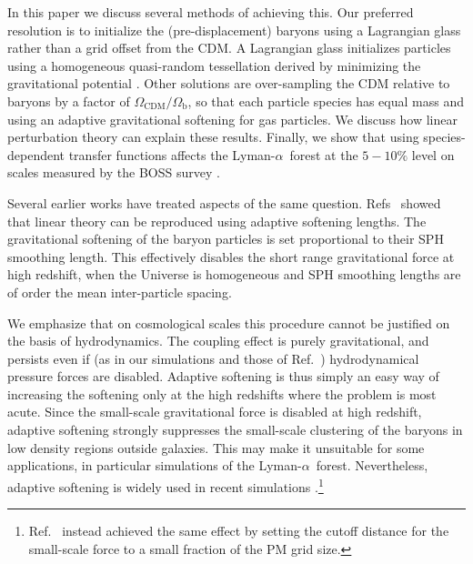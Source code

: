 \documentclass[a4paper,11pt]{article}
\newcommand{\Lya}{Lyman-$\alpha$}
\begin{document}
In this paper we discuss several methods of achieving this. Our preferred resolution is to initialize the (pre-displacement) baryons using a Lagrangian glass rather than a grid offset from the CDM. A Lagrangian glass initializes particles using a homogeneous quasi-random tessellation derived by minimizing the gravitational potential \cite{White:1994}. Other solutions are over-sampling the CDM relative to baryons by a factor of $\Omega_\mathrm{CDM}/\Omega_\mathrm{b}$, so that each particle species has equal mass and using an adaptive gravitational softening for gas particles. We discuss how linear perturbation theory can explain these results. Finally, we show that using species-dependent transfer functions affects the \Lya~forest at the $5-10\%$ level on scales measured by the BOSS survey \cite{PD2013}.



Several earlier works have treated aspects of the same question. Refs~\cite{OLeary:2012, Angulo:2013} showed that linear theory can be reproduced using adaptive softening lengths. The gravitational softening of the baryon particles is set proportional to their SPH smoothing length. This effectively disables the short range gravitational force at high redshift, when the Universe is homogeneous and SPH smoothing lengths are of order the mean inter-particle spacing.

We emphasize that on cosmological scales this procedure cannot be justified on the basis of hydrodynamics. The coupling effect is purely gravitational, and persists even if (as in our simulations and those of Ref.~\cite{Angulo:2013}) hydrodynamical pressure forces are disabled. Adaptive softening is thus simply an easy way of increasing the softening only at the high redshifts where the problem is most acute. Since the small-scale gravitational force is disabled at high redshift, adaptive softening strongly suppresses the small-scale clustering of the baryons in low density regions outside galaxies. This may make it unsuitable for some applications, in particular simulations of the \Lya~forest. Nevertheless, adaptive softening is widely used in recent simulations \cite[e.g][]{Paco:2018}.\footnote{Ref.~\cite{Valkenburg:2017} instead achieved the same effect by setting the cutoff distance for the small-scale force to a small fraction of the PM grid size.}
\end{document}
